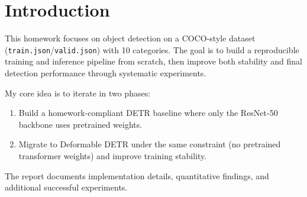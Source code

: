 \section{Introduction}
This homework focuses on object detection on a COCO-style dataset (\texttt{train.json}/\texttt{valid.json}) with 10 categories.
The goal is to build a reproducible training and inference pipeline from scratch, then improve both stability and final detection performance through systematic experiments.

My core idea is to iterate in two phases:
\begin{enumerate}
    \item Build a homework-compliant DETR baseline where only the ResNet-50 backbone uses pretrained weights.
    \item Migrate to Deformable DETR under the same constraint (no pretrained transformer weights) and improve training stability.
\end{enumerate}

The report documents implementation details, quantitative findings, and additional successful experiments.
